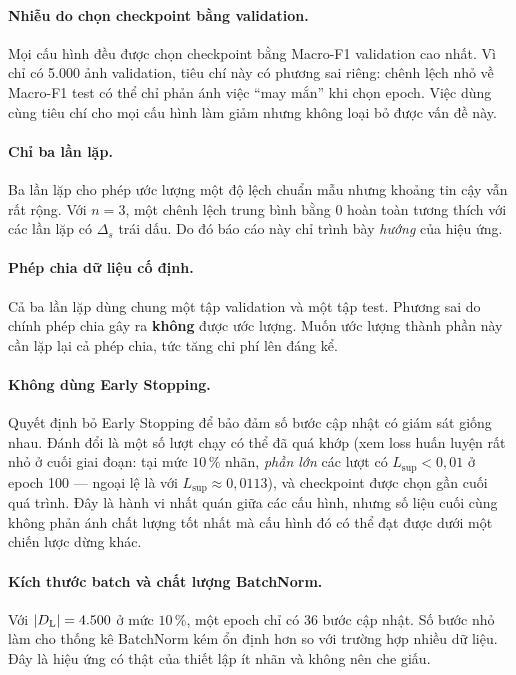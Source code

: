 \paragraph{Nhiễu do chọn checkpoint bằng validation.}
Mọi cấu hình đều được chọn checkpoint bằng Macro-F1 validation cao nhất. Vì chỉ có 5.000 ảnh
validation, tiêu chí này có phương sai riêng: chênh lệch nhỏ về Macro-F1 test có thể chỉ phản
ánh việc \enquote{may mắn} khi chọn epoch. Việc dùng cùng tiêu chí cho mọi cấu hình làm giảm
nhưng không loại bỏ được vấn đề này.

\paragraph{Chỉ ba lần lặp.}
Ba lần lặp cho phép ước lượng một độ lệch chuẩn mẫu nhưng khoảng tin cậy vẫn rất rộng. Với
$n=3$, một chênh lệch trung bình bằng $0$ hoàn toàn tương thích với các lần lặp có $\Delta_s$
trái dấu. Do đó báo cáo này chỉ trình bày \emph{hướng} của hiệu ứng.

\paragraph{Phép chia dữ liệu cố định.}
Cả ba lần lặp dùng chung một tập validation và một tập test. Phương sai do chính phép chia gây
ra \textbf{không} được ước lượng. Muốn ước lượng thành phần này cần lặp lại cả phép chia, tức
tăng chi phí lên đáng kể.

\paragraph{Không dùng Early Stopping.}
Quyết định bỏ Early Stopping để bảo đảm số bước cập nhật có giám sát giống nhau. Đánh đổi là
một số lượt chạy có thể đã quá khớp (xem loss huấn luyện rất nhỏ ở cuối giai đoạn: tại mức
$10\,\%$ nhãn, \emph{phần lớn} các lượt có $L_{\mathrm{sup}} < 0{,}01$ ở epoch 100 — ngoại lệ
là  với $L_{\mathrm{sup}} \approx 0{,}0113$), và checkpoint được chọn gần
cuối quá trình. Đây là hành vi nhất quán giữa các cấu hình, nhưng số liệu cuối cùng không phản
ánh chất lượng tốt nhất mà cấu hình đó có thể đạt được dưới một chiến lược dừng khác.

\paragraph{Kích thước batch và chất lượng BatchNorm.}
Với $|D_{\mathrm{L}}| = 4.500$ ở mức $10\,\%$, một epoch chỉ có 36 bước cập nhật. Số bước nhỏ làm cho
thống kê BatchNorm kém ổn định hơn so với trường hợp nhiều dữ liệu. Đây là hiệu ứng có thật của
thiết lập ít nhãn và không nên che giấu.

